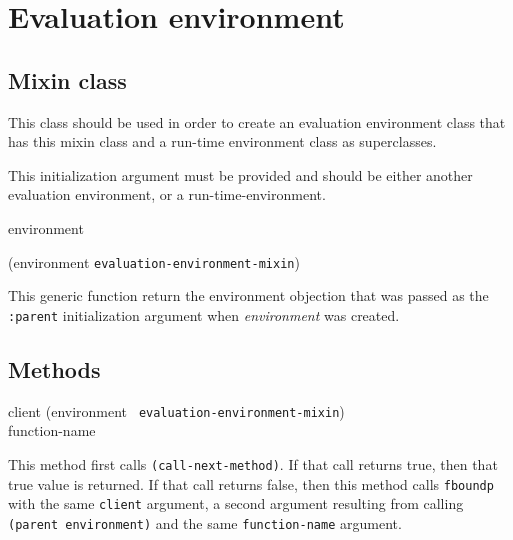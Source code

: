 \chapter{Evaluation environment}

\section{Mixin class}


This class should be used in order to create an evaluation environment
class that has this mixin class and a run-time environment class as
superclasses.


This initialization argument must be provided and should be either
another evaluation environment, or a run-time-environment.

 {environment}

 {(environment {\tt evaluation-environment-mixin})}

This generic function return the environment objection that was passed
as the \texttt{:parent} initialization argument when
\textit{environment} was created.

\section{Methods}

{\small{} {client (environment {\tt
      evaluation-environment-mixin}) \\ function-name}
}

This method first calls \texttt{(call-next-method)}.  If that call
returns true, then that true value is returned.  If that call returns
false, then this method calls \texttt{fboundp} with the same \texttt{client}
argument, a second argument resulting from calling \texttt{(parent
  environment)} and the same \texttt{function-name} argument.
